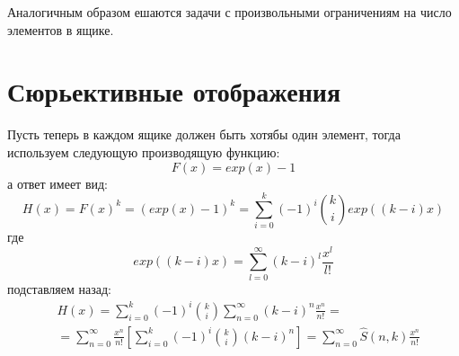 Аналогичным образом ешаются задачи с произвольными ограничениям на число элементов в ящике.

\section{Сюрьективные отображения}

Пусть теперь в каждом ящике должен быть хотябы один элемент, тогда используем следующую производящую функцию:
\[
	F\left(x\right) = exp\left(x\right) - 1
\]
а ответ имеет вид:
\[
	H\left(x\right) = F\left(x\right)^k = \left(exp\left(x\right)-1\right)^k = \sum_{i=0}^k\left(-1\right)^i \binom{k}{i} exp\left(\left(k-i\right)x\right)
\]
где
\[
	exp\left(\left(k-i\right)x\right) = \sum_{l=0}^\infty \left(k-i\right)^l\frac{x^l}{l!}
\]
подставляем назад:
\[
	\begin{split}
		& H\left(x\right) = \sum_{i=0}^k\left(-1\right)^i\binom{k}{i}\sum_{n=0}^\infty \left(k-i\right)^n \frac{x^n}{n!} = \\
		& = \sum_{n=0}^\infty \frac{x^n}{n!} \left[\sum_{i=0}^k \left(-1\right)^i\binom{k}{i}\left(k-i\right)^n\right] = \sum_{n=0}^\infty \hat S\left(n,k\right) \frac{x^n}{n!}
	\end{split}
\]
